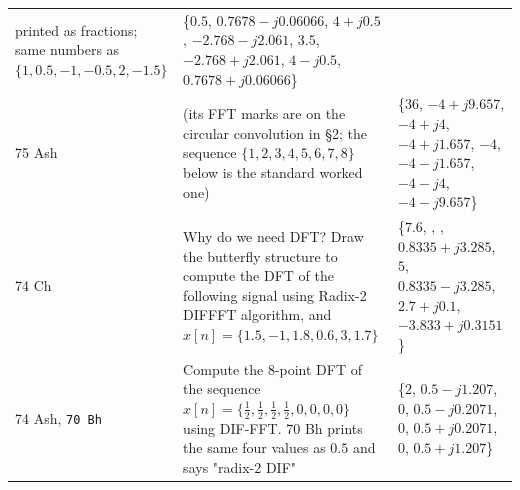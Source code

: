 {\begin{tabular}{@{}L{1.45cm}L{8.1cm}L{7.5cm}@{}}
  {\color{sub}printed as fractions; same numbers as $\{1,0.5,-1,-0.5,2,-1.5\}$}
  & \{$0.5$, $0.7678{-}j0.06066$, $4{+}j0.5$, $-2.768{-}j2.061$, $3.5$, $-2.768{+}j2.061$, $4{-}j0.5$, $0.7678{+}j0.06066$\} \\
75 Ash & (its FFT marks are on the circular convolution in \S2; the sequence
  $\{1,2,3,4,5,6,7,8\}$ below is the standard worked one)
  & \{$36$, $-4{+}j9.657$, $-4{+}j4$, $-4{+}j1.657$, $-4$, $-4{-}j1.657$, $-4{-}j4$, $-4{-}j9.657$\} \\
74 Ch & Why do we need DFT? Draw the butterfly structure to compute the DFT of the
  following signal using Radix-2 DIFFFT algorithm, and  $x[n]=\{1.5,-1,1.8,0.6,3,1.7\}$ 
  & \{$7.6$, , , $0.8335{+}j3.285$, $5$, $0.8335{-}j3.285$, $2.7{+}j0.1$, $-3.833{+}j0.3151$\} \\
74 Ash, \texttt{70 Bh} & Compute the 8-point DFT of the sequence
  $x[n]=\{\tfrac12,\tfrac12,\tfrac12,\tfrac12,0,0,0,0\}$ using DIF-FFT.  \newline
  {\color{sub}70 Bh prints the same four values as $0.5$ and says "radix-2 DIF"} 
  & \{$2$, $0.5{-}j1.207$, $0$, $0.5{-}j0.2071$, $0$, $0.5{+}j0.2071$, $0$, $0.5{+}j1.207$\} \\
\bottomrule
\end{tabular}}
\par\smallskip
